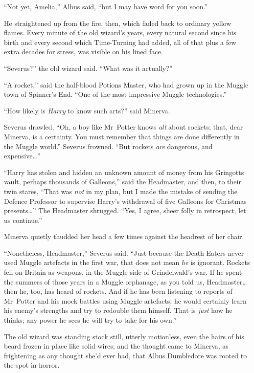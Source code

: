 “Not yet, Amelia,” Albus said, “but I may have word for you soon.”

He straightened up from the fire, then, which faded back to ordinary yellow flames. Every minute of the old wizard’s years, every natural second since his birth and every second which Time-Turning had added, all of that plus a few extra decades for stress, was visible on his lined face.

“Severus?” the old wizard said. “What was it actually?”

“A rocket,” said the half-blood Potions Master, who had grown up in the Muggle town of Spinner’s End. “One of the most impressive Muggle technologies.”

“How likely is \emph{Harry} to know such arts?” said Minerva.

Severus drawled, “Oh, a boy like Mr~Potter knows \emph{all} about rockets; that, dear Minerva, is a certainty. You must remember that things are done differently in the Muggle world.” Severus frowned. “But rockets \emph{are} dangerous, and expensive…”

“Harry has stolen and hidden an unknown amount of money from his Gringotts vault, perhaps thousands of Galleons,” said the Headmaster, and then, to their twin stares, “That was \emph{not} in my plan, but I made the mistake of sending the Defence Professor to supervise Harry’s withdrawal of five Galleons for Christmas presents…” The Headmaster shrugged. “Yes, I agree, sheer folly in retrospect, let us continue.”

Minerva quietly thudded her head a few times against the headrest of her chair.

“Nonetheless, Headmaster,” Severus said. “Just because the Death Eaters never used Muggle artefacts in the first war, that does not mean \emph{he} is ignorant. Rockets fell on Britain as weapons, in the Muggle side of Grindelwald’s war. If he spent the summers of those years in a Muggle orphanage, as you told us, Headmaster…then he, too, has heard of rockets. And if he has been listening to reports of Mr~Potter and his mock battles using Muggle artefacts, he would certainly learn his enemy’s strengths and try to redouble them himself. That is \emph{just} how he thinks; any power he sees he will try to take for his own.”

The old wizard was standing stock still, utterly motionless, even the hairs of his beard frozen in place like solid wires; and the thought came to Minerva, as frightening as any thought she’d ever had, that Albus Dumbledore was rooted to the spot in horror.


